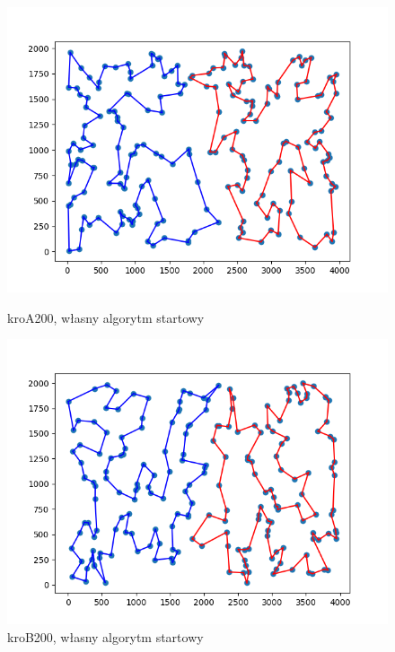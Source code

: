 \documentclass[11pt]{article}
\begin{document}
\begin{figure}[H]
    \vspace{0.5cm}

    \begin{minipage}[t]{0.45\textwidth}
        \centering
        \includegraphics[width=\linewidth]{best_paths/kroA200/traverse_greedy/split_paths_regret_TSP.png}
        \caption{kroA200, własny algorytm startowy}
    \end{minipage}
    \hfill
    \begin{minipage}[t]{0.45\textwidth}
        \centering
        \includegraphics[width=\linewidth]{best_paths/kroB200/traverse_greedy/split_paths_regret_TSP.png}
        \caption{kroB200, własny algorytm startowy}
    \end{minipage}
    \label{fig:minipage-greedy-edge}
\end{figure}
\end{document}
